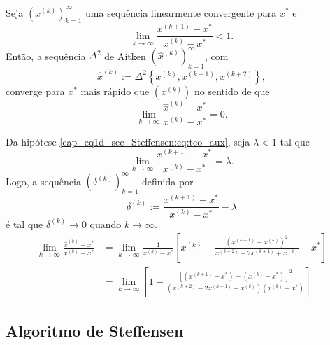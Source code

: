 \begin{teo}
  Seja $\left(x^{(k)}\right)_{k=1}^\infty$ uma sequência linearmente convergente para $x^*$ e
  \begin{equation}\label{cap_eq1d_sec_Steffensen:eq:teo_aux}
    \lim_{k\to\infty}\frac{x^{(k+1)}-x^*}{x^{(k)}-x^*} < 1.
  \end{equation}
  Então, a sequência $\Delta^2$ de Aitken $\left(\hat{x}^{(k)}\right)_{k=1}^\infty$, com
  \begin{equation}
    \hat{x}^{(k)} := \Delta^2\left\{x^{(k)}, x^{(k+1)}, x^{(k+2)}\right\},
  \end{equation}
  converge para $x^*$ mais rápido que $\left(x^{(k)}\right)$ no sentido de que
  \begin{equation}
    \lim_{k\to\infty}\frac{\hat{x}^{(k)}-x^*}{x^{(k)}-x^*} = 0.
  \end{equation}
\end{teo}
\begin{dem}
  Da hipótese \eqref{cap_eq1d_sec_Steffensen:eq:teo_aux}, seja $\lambda < 1$ tal que
  \begin{equation}
    \lim_{k\to\infty}\frac{x^{(k+1)}-x^*}{x^{(k)}-x^*} = \lambda.
  \end{equation}
  Logo, a sequência $\left(\delta^{(k)}\right)_{k=1}^\infty$ definida por
  \begin{equation}
    \delta^{(k)} := \frac{x^{(k+1)}-x^*}{x^{(k)}-x^*} - \lambda
  \end{equation}
  é tal que $\delta^{(k)}\to 0$ quando $k\to\infty$.
  \begin{align}
    \lim_{k\to\infty}\frac{\hat{x}^{(k)}-x^*}{x^{(k)}-x^*} &= \lim_{k\to\infty} \frac{1}{x^{(k)}-x^*}\left[x^{(k)}-\frac{\left(x^{(k+1)}-x^{(k)}\right)^2}{x^{(k+2)}-2x^{(k+1)}+x^{(k)}} - x^*\right]\\
                                                           &= \lim_{k\to\infty}\left[1-\frac{\left[\left(x^{(k+1)}-x^*\right)-\left(x^{(k)}-x^*\right)\right]^2}{\left(x^{(k+2)}-2x^{(k+1)}+x^{(k)}\right)\left(x^{(k)}-x^*\right)}\right]
  \end{align}
  \emconstrucao
\end{dem}

\subsection{Algoritmo de Steffensen}

